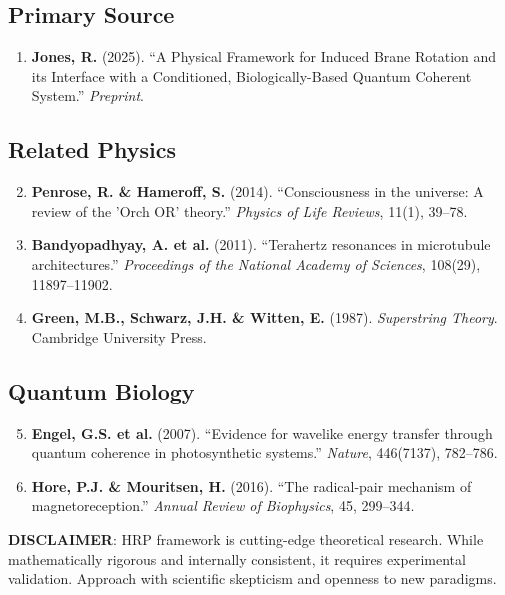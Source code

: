 \subsection*{Primary Source}

\begin{enumerate}
\item \textbf{Jones, R.} (2025). ``A Physical Framework for Induced Brane Rotation and its Interface with a Conditioned, Biologically-Based Quantum Coherent System.'' \emph{Preprint}.
\end{enumerate}

\subsection*{Related Physics}

\begin{enumerate}
\setcounter{enumi}{1}
\item \textbf{Penrose, R. \& Hameroff, S.} (2014). ``Consciousness in the universe: A review of the 'Orch OR' theory.'' \emph{Physics of Life Reviews}, 11(1), 39--78.
\item \textbf{Bandyopadhyay, A. et al.} (2011). ``Terahertz resonances in microtubule architectures.'' \emph{Proceedings of the National Academy of Sciences}, 108(29), 11897--11902.
\item \textbf{Green, M.B., Schwarz, J.H. \& Witten, E.} (1987). \emph{Superstring Theory}. Cambridge University Press.
\end{enumerate}

\subsection*{Quantum Biology}

\begin{enumerate}
\setcounter{enumi}{4}
\item \textbf{Engel, G.S. et al.} (2007). ``Evidence for wavelike energy transfer through quantum coherence in photosynthetic systems.'' \emph{Nature}, 446(7137), 782--786.
\item \textbf{Hore, P.J. \& Mouritsen, H.} (2016). ``The radical-pair mechanism of magnetoreception.'' \emph{Annual Review of Biophysics}, 45, 299--344.
\end{enumerate}

\vspace{1em}

\begin{warningbox}
\textbf{DISCLAIMER}: HRP framework is cutting-edge theoretical research. While mathematically rigorous and internally consistent, it requires experimental validation. Approach with scientific skepticism and openness to new paradigms.
\end{warningbox}
